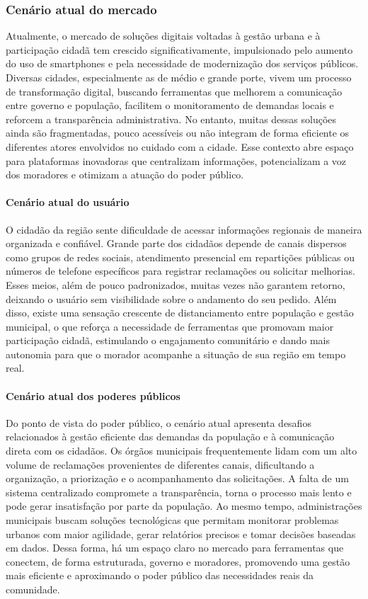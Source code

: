 \subsubsection{Cenário atual do mercado}

Atualmente, o mercado de soluções digitais voltadas à gestão urbana e à
participação cidadã tem crescido significativamente, impulsionado pelo aumento do
uso de smartphones e pela necessidade de modernização dos serviços públicos.
Diversas cidades, especialmente as de médio e grande porte, vivem um processo
de transformação digital, buscando ferramentas que melhorem a comunicação entre
governo e população, facilitem o monitoramento de demandas locais e reforcem a
transparência administrativa. No entanto, muitas dessas soluções ainda são
fragmentadas, pouco acessíveis ou não integram de forma eficiente os diferentes
atores envolvidos no cuidado com a cidade. Esse contexto abre espaço para
plataformas inovadoras que centralizam informações, potencializam a voz dos
moradores e otimizam a atuação do poder público.

\paragraph{Cenário atual do usuário}

O cidadão da região sente dificuldade de acessar informações regionais de maneira
organizada e confiável. Grande parte dos cidadãos depende de canais dispersos
como grupos de redes sociais, atendimento presencial em repartições públicas ou
números de telefone específicos para registrar reclamações ou solicitar melhorias.
Esses meios, além de pouco padronizados, muitas vezes não garantem retorno,
deixando o usuário sem visibilidade sobre o andamento do seu pedido. Além disso,
existe uma sensação crescente de distanciamento entre população e gestão
municipal, o que reforça a necessidade de ferramentas que promovam maior
participação cidadã, estimulando o engajamento comunitário e dando mais
autonomia para que o morador acompanhe a situação de sua região em tempo real.

\paragraph{Cenário atual dos poderes públicos}

Do ponto de vista do poder público, o cenário atual apresenta desafios relacionados
à gestão eficiente das demandas da população e à comunicação direta com os
cidadãos. Os órgãos municipais frequentemente lidam com um alto volume de
reclamações provenientes de diferentes canais, dificultando a organização, a
priorização e o acompanhamento das solicitações. A falta de um sistema
centralizado compromete a transparência, torna o processo mais lento e pode gerar
insatisfação por parte da população. Ao mesmo tempo, administrações municipais
buscam soluções tecnológicas que permitam monitorar problemas urbanos com
maior agilidade, gerar relatórios precisos e tomar decisões baseadas em dados.
Dessa forma, há um espaço claro no mercado para ferramentas que conectem, de
forma estruturada, governo e moradores, promovendo uma gestão mais eficiente e
aproximando o poder público das necessidades reais da comunidade.


